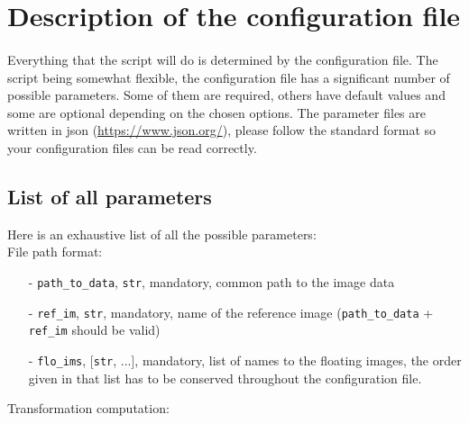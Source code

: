 \documentclass[10pt,a4paper]{book}
\begin{document}
\section{Description of the configuration file}
\paragraph{}Everything that the script will do is determined by the configuration file. The script being somewhat flexible, the configuration file has a significant number of possible parameters. Some of them are required, others have default values and some are optional depending on the chosen options. The parameter files are written in json (\url{https://www.json.org/}), please follow the standard format so your configuration files can be read correctly.
\subsection{List of all parameters}
Here is an exhaustive list of all the possible parameters:\\
File path format:
\begin{enumerate}
\item[-] \texttt{path\_to\_data}, \texttt{str}, mandatory, common path to the image data
\item[-] \texttt{ref\_im}, \texttt{str}, mandatory, name of the reference image (\texttt{path\_to\_data} + \texttt{ref\_im} should be valid)
\item[-] \texttt{flo\_ims}, [\texttt{str}, ...], mandatory, list of names to the floating images, the order given in that list has to be conserved throughout the configuration file.
\end{enumerate}
Transformation computation:
\end{document}
